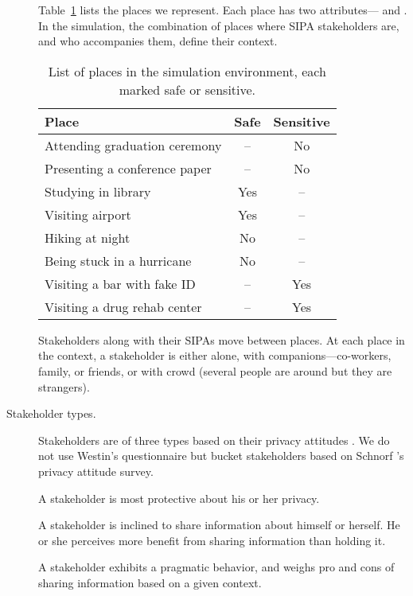 \begin{description}
Table~\ref{tab:places} lists the places we represent. Each place has two attributes--- and . In the simulation, the combination of places where SIPA stakeholders are, and who accompanies them, define their context.

\begin{table}[!htb]
\centering
\caption{List of places in the simulation environment, each marked safe or sensitive.}
\label{tab:places}
\begin{tabular}{lcc}
\toprule
Place & Safe & Sensitive \\\midrule
\rowcolor{lightgray!50!}
Attending graduation ceremony & -- & No \\
Presenting a conference paper & -- & No \\
\rowcolor{lightgray!50!}
Studying in library & Yes & -- \\
Visiting airport & Yes & -- \\
\rowcolor{lightgray!50!}
Hiking at night & No & -- \\
Being stuck in a hurricane & No & -- \\
\rowcolor{lightgray!50!}
Visiting a bar with fake ID & -- & Yes \\
Visiting a drug rehab center & -- & Yes \\
\bottomrule
\end{tabular}
\end{table}

Stakeholders along with their SIPAs move between places. At each place in the context, a stakeholder is either alone, with companions---co-workers, family, or friends, or with crowd (several people are around but they are strangers). 

\item[Stakeholder types.] Stakeholders are of three types based on their privacy attitudes \citep{westin2003social}. 
We do not use Westin's questionnaire but bucket stakeholders based on Schnorf {\etal}'s  privacy attitude survey.

A  stakeholder is most protective about his or her privacy. 

A  stakeholder is inclined to share information about himself or herself. He or she perceives more benefit from sharing information than holding it. 

A  stakeholder exhibits a pragmatic behavior, and weighs pro and cons of sharing information based on a given context. 

\end{description}

